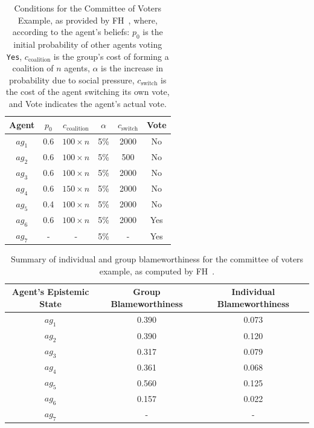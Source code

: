 \documentclass{article}
\begin{document}
\begin{table}[h]
  \centering
  \caption{Conditions for the Committee of Voters Example, as provided by FH~\cite{friedenberg_blameworthiness_2019}, where, according to the agent's beliefs: $p_0$ is the initial probability of other agents voting \texttt{Yes}, $c_\text{coalition}$ is the group's cost of forming a coalition of $n$ agents, $\alpha$ is the increase in probability due to social pressure, $c_\text{switch}$ is the cost of the agent switching its own vote, and Vote indicates the agent's actual vote.}
  \begin{tabular}{|c|c|c|c|c|c|}
    \hline
    Agent & $p_0$ & $c_\text{coalition}$ & $\alpha$ & $c_\text{switch}$ & Vote \\
    \hline
    $ag_1$ & 0.6 & $100 \times n$ & 5\% & 2000 & No  \\
    $ag_2$ & 0.6 & $100 \times n$ & 5\% & 500 & No  \\
    $ag_3$ & 0.6 & $100 \times n$ & 5\% & 2000 & No  \\
    $ag_4$ & 0.6 & $150 \times n$ & 5\% & 2000 & No  \\
    $ag_5$ & 0.4 & $100 \times n$ & 5\% & 2000 & No  \\
    $ag_6$ & 0.6 & $100 \times n$ & 5\% & 2000 & Yes  \\
    $ag_7$ & -  & - & 5\% & - & Yes \\
    \hline
  \end{tabular}
  \label{tab:committee_example_conditions}
\end{table}


\begin{table}[h]
  \centering
  \caption{Summary of individual and group blameworthiness for the committee of voters example, as computed by FH~\cite{friedenberg_blameworthiness_2019}.}
  \begin{tabular}{|c|c|c|}
    \hline
    Agent's Epistemic State & Group Blameworthiness & Individual Blameworthiness \\
    \hline
    $ag_1$ & 0.390 & 0.073 \\
    $ag_2$ & 0.390 & 0.120 \\
    $ag_3$ & 0.317 & 0.079 \\
    $ag_4$ & 0.361 & 0.068 \\
    $ag_5$ & 0.560 & 0.125 \\
    $ag_6$ & 0.157 & 0.022 \\
    $ag_7$ & - & - \\
    \hline
  \end{tabular}
  \label{tab:committee_example_results}
\end{table}
\end{document}

